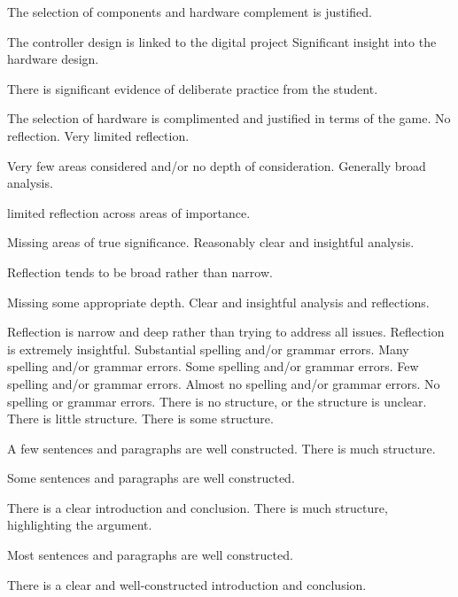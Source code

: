 \documentclass{../../fal_assignment}
\begin{document}
\begin{markingrubric}
	\par The selection of components and hardware complement is justified.
	\par The controller design is linked to the digital project
	\grade Significant insight into the hardware design.
	\par There is significant evidence of deliberate practice from the student.
	\par The selection of hardware is complimented and justified in terms of the game.
	\grade\fail 	No reflection.
	\grade 		Very limited reflection.
	\par Very few areas considered and/or no depth of consideration.
	\grade 		Generally broad analysis.  
	\par limited reflection across areas of importance.
	\par Missing areas of true significance. 
	\grade 		Reasonably clear and insightful analysis.
	\par Reflection tends to be broad rather than narrow.
	\par Missing some appropriate depth. 
	\grade 		Clear and insightful analysis and reflections.
	\par Reflection is narrow and deep rather than trying to address all issues.
	\grade 		Reflection is extremely insightful.
	\grade\fail 	Substantial spelling and/or grammar errors.
	\grade 		Many spelling and/or grammar errors.
	\grade 		Some spelling and/or grammar errors.  
	\grade 		Few spelling and/or grammar errors.
	\grade 		Almost no spelling and/or grammar errors.
	\grade 		No spelling or grammar errors.
    \grade\fail 	There is no structure, or the structure is unclear.
	\grade 		There is little structure.
	\grade 		There is some structure.
	\par 		A few sentences and paragraphs are well constructed.
	\grade 		There is much structure.
	\par 		Some sentences and paragraphs are well constructed.
	\par 		There is a clear introduction and conclusion.
	\grade 		There is much structure, highlighting the argument.
	\par 		Most sentences and paragraphs are well constructed.
	\par 		There is a clear and well-constructed introduction and conclusion.

\end{markingrubric}
\end{document}
